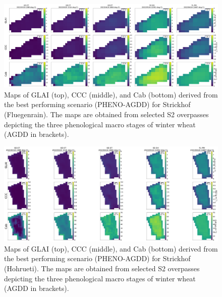 \begin{figure}[H]
    \centering
    \includegraphics[width=1\textwidth]{05-Insights/img/Strickhof_Fluegenrain_Trait_Maps.png}
    \caption[Maps of GLAI (top), CCC (middle), and Cab (bottom) derived from the best performing scenario (PHENO-AGDD) for Strickhof (Fluegenrain). The maps are obtained from selected S2 overpasses depicting the three phenological macro stages of winter wheat (AGDD in brackets).]{Maps of GLAI (top), CCC (middle), and Cab (bottom) derived from the best performing scenario (PHENO-AGDD) for Strickhof (Fluegenrain). The maps are obtained from selected S2 overpasses depicting the three phenological macro stages of winter wheat (AGDD in brackets).}
    \label{fig:appendix_sh_fluegenrain_2022}
\end{figure}

\begin{figure}[H]
    \centering
    \includegraphics[width=1\textwidth]{05-Insights/img/Strickhof_Hohrueti_Trait_Maps.png}
    \caption[Maps of GLAI (top), CCC (middle), and Cab (bottom) derived from the best performing scenario (PHENO-AGDD) for Strickhof (Hohrueti). The maps are obtained from selected S2 overpasses depicting the three phenological macro stages of winter wheat (AGDD in brackets).]{Maps of GLAI (top), CCC (middle), and Cab (bottom) derived from the best performing scenario (PHENO-AGDD) for Strickhof (Hohrueti). The maps are obtained from selected S2 overpasses depicting the three phenological macro stages of winter wheat (AGDD in brackets).}
    \label{fig:appendix_sh_hohrueti_2022}
\end{figure}

